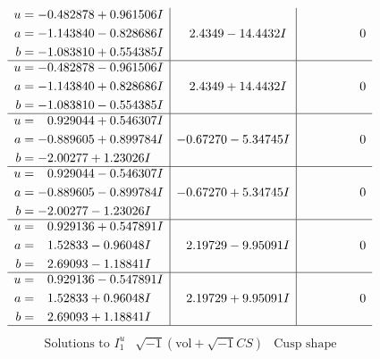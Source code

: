 \documentclass[1p]{elsarticle_modified}
\theoremstyle{definition}
\newcommand{\I}{\sqrt{-1}}
\begin{document}
$$\begin{array}{c|c|c}
\begin{aligned}
u &= -0.482878 + 0.961506 I \\
a &= -1.143840 - 0.828686 I \\
b &= -1.083810 + 0.554385 I\end{aligned}
 & \phantom{-}2.4349 - 14.4432 I & \phantom{-0.000000 } 0 \\ \hline\begin{aligned}
u &= -0.482878 - 0.961506 I \\
a &= -1.143840 + 0.828686 I \\
b &= -1.083810 - 0.554385 I\end{aligned}
 & \phantom{-}2.4349 + 14.4432 I & \phantom{-0.000000 } 0 \\ \hline\begin{aligned}
u &= \phantom{-}0.929044 + 0.546307 I \\
a &= -0.889605 + 0.899784 I \\
b &= -2.00277 + 1.23026 I\end{aligned}
 & -0.67270 - 5.34745 I & \phantom{-0.000000 } 0 \\ \hline\begin{aligned}
u &= \phantom{-}0.929044 - 0.546307 I \\
a &= -0.889605 - 0.899784 I \\
b &= -2.00277 - 1.23026 I\end{aligned}
 & -0.67270 + 5.34745 I & \phantom{-0.000000 } 0 \\ \hline\begin{aligned}
u &= \phantom{-}0.929136 + 0.547891 I \\
a &= \phantom{-}1.52833 - 0.96048 I \\
b &= \phantom{-}2.69093 - 1.18841 I\end{aligned}
 & \phantom{-}2.19729 - 9.95091 I & \phantom{-0.000000 } 0 \\ \hline\begin{aligned}
u &= \phantom{-}0.929136 - 0.547891 I \\
a &= \phantom{-}1.52833 + 0.96048 I \\
b &= \phantom{-}2.69093 + 1.18841 I\end{aligned}
 & \phantom{-}2.19729 + 9.95091 I & \phantom{-0.000000 } 0\\
 \hline 
 \end{array}$$\newpage$$\begin{array}{c|c|c}  
\text{Solutions to }I^u_{1}& \I (\text{vol} + \sqrt{-1}CS) & \text{Cusp shape}\\
 \hline 
\begin{aligned}

\end{aligned}
\end{array}$$
\end{document}
